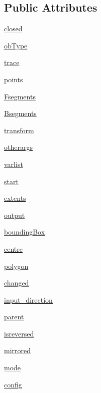\subsection*{Public Attributes}
\begin{DoxyCompactItemize}
\item 
\hyperlink{classpath_1_1_path_a537add4e1eef9920422656b6a0759d47}{closed}
\item 
\hyperlink{classpath_1_1_path_a5f76d0fb0a06d73b38f79528ca7c7611}{ob\+Type}
\item 
\hyperlink{classpath_1_1_path_a7c28949b03cd0ede340ca5329a845220}{trace}
\item 
\hyperlink{classpath_1_1_path_a5723ebb394e0c22b8426ca7a31c7f345}{points}
\item 
\hyperlink{classpath_1_1_path_abf6d3e08b8c336762ae78a242f69574f}{Fsegments}
\item 
\hyperlink{classpath_1_1_path_ac90e50464e0fcd8afa425e3a706716b9}{Bsegments}
\item 
\hyperlink{classpath_1_1_path_a18e1d6f703cbee9b5df9e326dc4dfe4d}{transform}
\item 
\hyperlink{classpath_1_1_path_a78b59e663ba7afb929d918d74081e6f6}{otherargs}
\item 
\hyperlink{classpath_1_1_path_a2e9e6fbbaa8a13ae3f6d634fda839383}{varlist}
\item 
\hyperlink{classpath_1_1_path_a41f1eb86fefc47e877323cd91313aa9b}{start}
\item 
\hyperlink{classpath_1_1_path_aebbcc8a89fc649f3afa2b18c71186fef}{extents}
\item 
\hyperlink{classpath_1_1_path_a3b09da18da506517817d6b1d85c08aa8}{output}
\item 
\hyperlink{classpath_1_1_path_adde8a7ba1a15327b7010a1cef412cbed}{bounding\+Box}
\item 
\hyperlink{classpath_1_1_path_a3bdcbf7c20d9a25b4ad138b6578f72f3}{centre}
\item 
\hyperlink{classpath_1_1_path_a2e8dfa39ef829bfc17d794dbe8543eda}{polygon}
\item 
\hyperlink{classpath_1_1_path_a7f7cad7f41927bbf090c9550eb057112}{changed}
\item 
\hyperlink{classpath_1_1_path_a2e9b1478c9ea417ce0d6e852c7095f4f}{input\+\_\+direction}
\item 
\hyperlink{classpath_1_1_path_afa252e375cf870407532af77b881f43f}{parent}
\item 
\hyperlink{classpath_1_1_path_a36bc8f2dc9601b9c7abd08890190aab0}{isreversed}
\item 
\hyperlink{classpath_1_1_path_a00b1a9227b72fe5bc60bcf7335f1f768}{mirrored}
\item 
\hyperlink{classpath_1_1_path_ab4089a2e9ac6e1b0539f194a572f4960}{mode}
\item 
\hyperlink{classpath_1_1_path_a889e352f02dba833077975ce855276ed}{config}
\end{DoxyCompactItemize}
